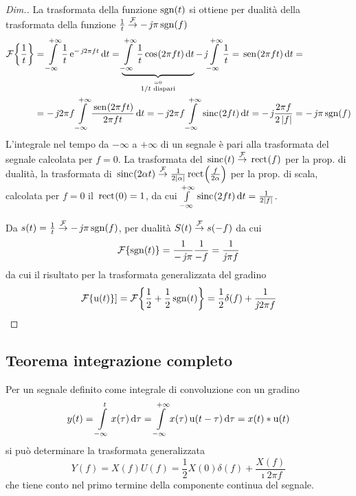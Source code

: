 \begin{proof}[Dim.]
La trasformata della funzione $\operatorname{sgn}(t)$ si ottiene per dualità della trasformata della funzione $\frac{1}{t}\overset{\operatorname{\mathcal{F}}}{\to}-\operatorname{\mathit{j}\!}\pi\operatorname{sgn}(f)$
\begin{align*}
\fourier{\frac{1}{t}}&=\intinf{\frac{1}{t}\e{-\imath 2\pi f t}}{t}= \underbrace{\intinf{\frac{1}{t}\cos{2\pi f t}}{t}}_{\stackrel{=0}{1/t \text{ dispari}}} -\imath\intinf{\frac{1}{t}=\sen{2\pi f t}}{t}=\\
&=-\imath 2\pi f\intinf{\frac{\sen{2\pi f t}}{2\pi f t}}{t}=-\imath 2\pi f\intinf{\sinc{2 f t}}{t}= -\imath\frac{2\pi f}{2\abs{f}} = -\imath\pi\sgn(f)
\end{align*}
L'integrale nel tempo da $-\infty$ a $+\infty$ di un segnale è pari alla trasformata del segnale calcolata per $f=0$. 
La trasformata del $\,{\operatorname{sinc}}^{}\!\left({t}\right)\overset{\operatorname{\mathcal{F}}}{\to}\,{\operatorname{rect}}^{}\!\left({f}\right)$ per la prop. di dualità, la trasformata di $\,{\operatorname{sinc}}^{}\!\left({2\alpha t}\right)\overset{\operatorname{\mathcal{F}}}{\to}\frac{1}{2\left|{\alpha}\right|}\,{\operatorname{rect}}^{}\!\left({\frac{f}{2\alpha}}\right)$ per la prop. di scala, calcolata per $f=0$ il $\,{\operatorname{rect}}^{}\!\left({0}\right)=1$, da cui $\int\limits_{-\infty}^{+\infty}{\,{\operatorname{sinc}}^{}\!\left({2 f t}\right)}{\,\mathop{}\!\mathrm{d}{t}}=\frac{1}{2\left|{f}\right|}$.

Da $s(t)=\frac{1}{t}\overset{\operatorname{\mathcal{F}}}{\to} -\operatorname{\mathit{j}\!}\pi\operatorname{sgn}(f)$, per dualità $S(t)\overset{\operatorname{\mathcal{F}}}{\to} s(-f)$ da cui \[\operatorname{\mathcal{F}}\!\left\lbrace{\operatorname{sgn}(t)}\right\rbrace=\frac{1}{-\operatorname{\mathit{j}\!}\pi}\frac{1}{-f}=\frac{1}{\operatorname{\mathit{j}\!}\pi f}\] da cui il risultato per la trasformata generalizzata del gradino \[\operatorname{\mathcal{F}}\!\left\lbrace{\operatorname{u}(t)}\right\rbrace]=\operatorname{\mathcal{F}}\!\left\lbrace{\frac{1}{2}+\frac{1}{2}\operatorname{sgn}(t)}\right\rbrace=\frac{1}{2}\delta(f)+\frac{1}{\operatorname{\mathit{j}\!} 2\pi f}\qedhere\]
\end{proof}

\subsection{Teorema integrazione completo}
Per un segnale definito come integrale di convoluzione con un gradino
\[y(t)=\int\limits_{-\infty}^{t}{x(\tau)}{\,\mathop{}\!\mathrm{d}{\tau}}=\int\limits_{-\infty}^{+\infty}{x(\tau)\operatorname{u}(t-\tau)}{\,\mathop{}\!\mathrm{d}{\tau}}=x(t)\ast\operatorname{u}(t)\]
si può determinare la trasformata generalizzata
\begin{equation}
Y(f)=X(f) U(f)=\frac{1}{2} X(0) \delta(f) + \frac{X(f)}{\imath 2\pi f}
\end{equation}
che tiene conto nel primo termine della componente continua del segnale.

